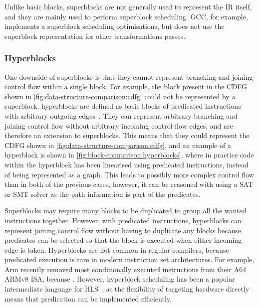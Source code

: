 Unlike \glspl{basic block}, \glspl{superblock} are not generally used to
represent the \gls{IR} itself, and they are mainly used to perform superblock
scheduling.  GCC, for example, implements a superblock scheduling optimisations,
but does not use the superblock representation for other transformations passes.

\subsubsection{Hyperblocks}

One downside of \glspl{superblock} is that they cannot represent branching and
joining control flow within a single block.  For example, the block present in
the \gls{CDFG} shown in \cref{fig:data-structure-comparison:cdfg} could not be
represented by a \gls{superblock}.  \Glspl{hyperblock} are defined as
\glspl{basic block} of \glspl{predicated instruction} with arbitrary outgoing
edges~\cite[]{mahlke92_effec_compil_suppor_predic_execut_using_hyper}.  They can
represent arbitrary branching and joining control flow without arbitrary
incoming control-flow edges, and are therefore an extension to
\glspl{superblock}.  This means that they could represent the \gls{CDFG} shown
in \cref{fig:data-structure-comparison:cdfg}, and an example of a hyperblock is
shown in \cref{fig:block-comparison:hyperblocks}, where in practice code within
the \gls{hyperblock} has been linearised using predicated instructions, instead
of being represented as a graph.  This leads to possibly more complex control
flow than in both of the previous cases, however, it can be reasoned with using
a \gls{SAT} or \gls{SMT} solver as the path information is part of the
predicates.

Superblocks may require many blocks to be duplicated to group all the wanted
instructions together.  However, with predicated instructions, hyperblocks can
represent joining control flow without having to duplicate any blocks because
predicates can be selected so that the block is executed when either incoming
edge is taken.  Hyperblocks are not common in regular compilers, because
predicated execution is rare in modern instruction set architectures.  For
example, Arm recently removed most conditionally executed instructions from
their A64 ARMv8 ISA, because .  However, hyperblock scheduling has been a popular
intermediate language for \gls{HLS}~\cite{budiu02_compil_applic_specif_hardw,
  callahan98_instr_level_paral_recon_comput}, as the flexibility of targeting
hardware directly means that predication can be implemented efficiently.

